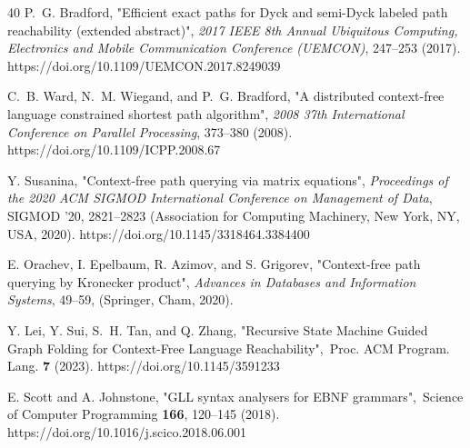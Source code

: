\documentclass[
11pt,%
tightenlines,%
twoside,%
onecolumn,%
nobibnotes,%
nofootinbib,%
superscriptaddress,%
noshowpacs,%
longbibliography,%
centertags]%
{revtex4-2}
\begin{document}
\begin{thebibliography}{40}
P.~G. Bradford,
"{Efficient exact paths for Dyck and semi-Dyck labeled path reachability (extended abstract)}",
\textit{2017 IEEE 8th Annual Ubiquitous Computing, Electronics and Mobile
Communication Conference (UEMCON)},
247--253
(2017). {https://doi.org/10.1109/UEMCON.2017.8249039}

C.~B. Ward, N.~M. Wiegand, and P.~G. Bradford,
"{A distributed context-free language constrained shortest path algorithm}",
\textit{2008 37th International Conference on Parallel Processing},
373--380
(2008). {https://doi.org/10.1109/ICPP.2008.67}

Y. Susanina, "{Context-free path querying via matrix equations}",
\textit{Proceedings of the 2020 ACM SIGMOD International Conference on Management
of Data}, SIGMOD '20,
2821--2823
(Association for Computing Machinery, New York, NY, USA, 2020). {https://doi.org/10.1145/3318464.3384400}

E. Orachev, I. Epelbaum, R. Azimov, and S. Grigorev,
"{Context-free path querying by Kronecker product}",
\textit{Advances in Databases and Information Systems},
49--59,
(Springer, Cham, 2020).

Y. Lei, Y. Sui, S.~H. Tan, and Q. Zhang,
"{Recursive State Machine Guided Graph Folding for Context-Free Language Reachability}",\
Proc. ACM Program. Lang. \textbf{7} (2023). {https://doi.org/10.1145/3591233}

E. Scott and A. Johnstone, "{GLL syntax analysers for EBNF grammars}",\
Science of Computer Programming \textbf{166}, 120--145 (2018). {https://doi.org/10.1016/j.scico.2018.06.001}



\end{thebibliography}

%
\end{document}

